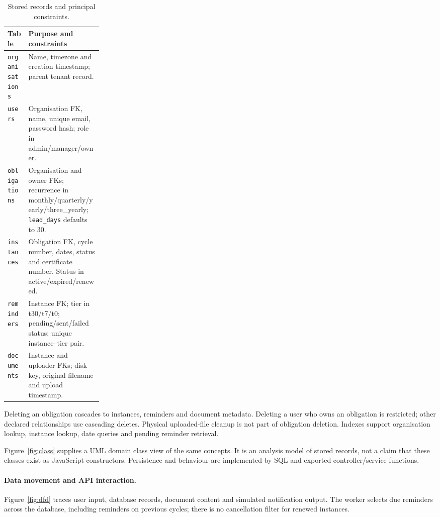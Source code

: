 \begin{table}[H]\centering\small
\begin{tabularx}{\linewidth}{@{}>{\raggedright\arraybackslash}p{0.22\linewidth}Y@{}}\toprule
Table & Purpose and constraints\\\midrule
\texttt{organisations} & Name, timezone and creation timestamp; parent tenant record.\\
\texttt{users} & Organisation FK, name, unique email, password hash; role in admin/manager/owner.\\
\texttt{obligations} & Organisation and owner FKs; recurrence in monthly/quarterly/yearly/three\_yearly; \texttt{lead\_days} defaults to 30.\\
\texttt{instances} & Obligation FK, cycle number, dates, status and certificate number. Status in active/expired/renewed.\\
\texttt{reminders} & Instance FK; tier in t30/t7/t0; pending/sent/failed status; unique instance--tier pair.\\
\texttt{documents} & Instance and uploader FKs; disk key, original filename and upload timestamp.\\\bottomrule
\end{tabularx}
\caption{Stored records and principal constraints.}\label{tab:schema}
\end{table}
Deleting an obligation cascades to instances, reminders and document metadata. Deleting a user who owns an obligation is restricted; other declared relationships use cascading deletes. Physical uploaded-file cleanup is not part of obligation deletion. Indexes support organisation lookup, instance lookup, date queries and pending reminder retrieval.

Figure~\ref{fig:class} supplies a UML domain class view of the same concepts. It is an analysis model of stored records, not a claim that these classes exist as JavaScript constructors. Persistence and behaviour are implemented by SQL and exported controller/service functions.

\paragraph{Data movement and API interaction.}
Figure~\ref{fig:dfd} traces user input, database records, document content and simulated notification output. The worker selects due reminders across the database, including reminders on previous cycles; there is no cancellation filter for renewed instances.

